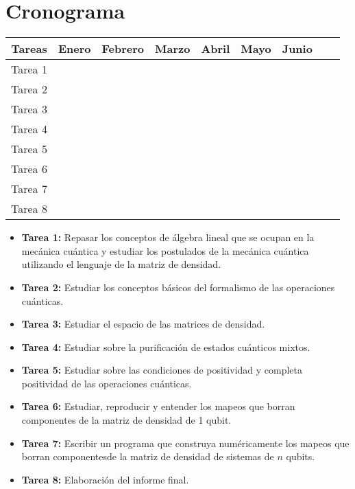 \documentclass[11pt, spanish, letterpage]{article} %
\begin{document}
\section{Cronograma} %
\begin{center}
\begingroup
\setlength{\tabcolsep}{10pt} %
\renewcommand{\arraystretch}{1.2} %
\begin{tabular}{|c|c|c|c|c|c|c|c|c|}
\hline
\textbf{Tareas} & \textbf{Enero} & \textbf{Febrero} & \textbf{Marzo} & \textbf{Abril} & \textbf{Mayo} & \textbf{Junio} \\ \hline
Tarea 1 & \cellcolor[gray]{0.5} &  &  &  &  &	\\ \hline
Tarea 2 & \cellcolor[gray]{0.5} & & & & &	\\ \hline
Tarea 3 & & \cellcolor[gray]{0.5} & & & &	\\ \hline
Tarea 4 & & \cellcolor[gray]{0.5} & & & &	\\ \hline
Tarea 5 & & & \cellcolor[gray]{0.5} & & &	\\ \hline
Tarea 6 & & & \cellcolor[gray]{0.5} & & &	\\ \hline
Tarea 7 & & & \cellcolor[gray]{0.5} & \cellcolor[gray]{0.5} & \cellcolor[gray]{0.5} &	\\ \hline
Tarea 8 & & & & & & \cellcolor[gray]{0.5}	\\ \hline
\end{tabular}
\endgroup
\end{center}

\begin{itemize}
	\item \textbf{Tarea 1:} Repasar los conceptos de álgebra lineal que se ocupan
	en la mecánica cuántica y estudiar los postulados de la mecánica cuántica 
	utilizando el lenguaje de la matriz de densidad.
	\item \textbf{Tarea 2:} Estudiar los conceptos básicos del formalismo de las
	operaciones cuánticas.
	\item \textbf{Tarea 3:} Estudiar el espacio de las matrices de densidad.
	\item \textbf{Tarea 4:} Estudiar sobre la purificación de estados cuánticos mixtos.
	\item \textbf{Tarea 5:} Estudiar sobre las condiciones de positividad y completa
	positividad de las operaciones cuánticas.
	\item \textbf{Tarea 6:} Estudiar, reproducir y entender los mapeos que borran 
	componentes de la matriz de densidad de 1 qubit.
	\item \textbf{Tarea 7:} Escribir un programa que construya numéricamente los mapeos
	que borran componentesde la matriz de densidad de sistemas de $n$ qubits.
	\item \textbf{Tarea 8:} Elaboración del informe final. 
\end{itemize}


\end{document}
